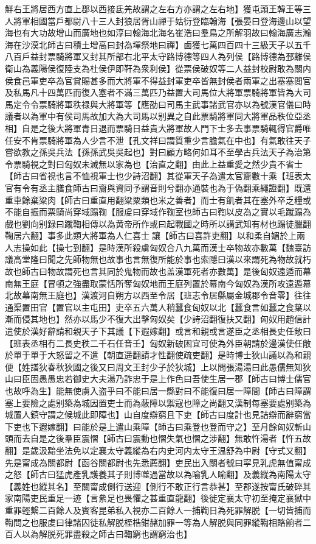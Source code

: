鮮右王將居西方直上郡以西接氐羌故謂之左右方亦謂之左右地】獲屯頭王韓王等三人將軍相國當戶都尉八十三人封狼居胥山禪于姑衍登臨翰海【張晏曰登海邊山以望海也有大功故增山而廣地也如淳曰翰海北海名崔浩曰羣鳥之所解羽故曰翰海廣志瀚海在沙漠北師古曰積土增高曰封為墠祭地曰禪】鹵獲七萬四百四十三級天子以五千八百戶益封票騎將軍又封其所部右北平太守路博德等四人為列侯【路博德為邳離侯衛山為義陽侯復陸支為杜侯伊即靬為衆利侯】從票侯破奴等二人益封校尉敢為關内侯食邑軍吏卒為官賞賜甚多而大將軍不得益封軍吏卒皆無封侯者兩軍之出塞塞閲官及私馬凡十四萬匹而復入塞者不滿三萬匹乃益置大司馬位大將軍票騎將軍皆為大司馬定令令票騎將軍秩禄與大將軍等【應劭曰司馬主武事諸武官亦以為號漢官儀曰時議者以為軍中有侯司馬故加大為大司馬以别異之自此票騎將軍同大將軍品秩位亞丞相】自是之後大將軍青日退而票騎日益貴大將軍故人門下士多去事票騎輒得官爵唯任安不肯票騎將軍為人少言不泄【孔文祥曰謂質重少言膽氣在中也】有氣敢往天子嘗欲教之孫吳兵法【孫孫武吳吳起也】對曰顧方略何如耳不至學古兵法天子為治第令票騎視之對曰匈奴未滅無以家為也【治直之翻】由此上益重愛之然少貴不省士【師古曰省視也言不恤視軍士也少詩沼翻】其從軍天子為遣太官齎數十乘【班表太官有令有丞主膳食師古曰齎與資同予謂音則兮翻亦通裝也為于偽翻乘繩證翻】既還重車餘棄粱肉【師古曰重直用翻粱粟類也米之善者】而士有飢者其在塞外卒乏糧或不能自振而票騎尚穿域蹋鞠【服䖍曰穿域作鞠室也師古曰鞫以皮為之實以毛蹴蹋為戲也劉向别録曰蹴鞫相傳以為黄帝所作或曰起戰國之時所以講武知有材也蹋徒臘翻鞠居六翻】事多此類大將軍為人仁喜士讓【師古曰喜許吏翻】以和柔自媚於上兩人志操如此【操七到翻】是時漢所殺虜匈奴合八九萬而漢士卒物故亦數萬【魏臺訪議高堂隆曰聞之先師物無也故事也言無復所能於事也索隱曰漢以來謂死為物故就朽故也師古曰物故謂死也言其同於鬼物而故也盖漢軍死者亦數萬】是後匈奴遠遁而幕南無王庭【冒頓之強盡取蒙恬所奪匈奴地而王庭列置於幕南今匈奴為漢所攻遠遁幕北故幕南無王庭也】漢渡河自朔方以西至令居【班志令居縣屬金城郡令音零】往往通渠置田官【置官以主屯田】吏卒五六萬人稍蠶食匈奴以北【蠶食言如蠶之食葉以漸而侵其地也】然亦以馬少不復大出擊匈奴矣【少詩沼翻復扶又翻】匈奴用趙信計遣使於漢好辭請和親天子下其議【下遐嫁翻】或言和親或言遂臣之丞相長史任敞曰【班表丞相冇二長史秩二千石任音壬】匈奴新破困宜可使為外臣朝請於邊漢使任敞於單于單于大怒留之不遣【朝直遥翻請才性翻使疏吏翻】是時博士狄山議以為和親便【姓譜狄春秋狄國之後又曰周文王封少子於狄城】上以問張湯湯曰此愚儒無知狄山曰臣固愚愚忠若御史大夫湯乃詐忠于是上作色曰吾使生居一郡【師古曰博士儒官也故呼為生】能無使虜入盗乎曰不能曰居一縣對曰不能復曰居一障間【師古曰障謂塞上要險之處别築為城因置吏士而為蔽障以禦寇也障之尚翻又漢制每塞要處别築為城置人鎮守謂之候城此即障也】山自度辯窮且下吏【師古曰度計也見詰辯而辭窮當下吏也下遐嫁翻】曰能於是上遣山乘障【師古曰乘登也登而守之】至月餘匈奴斬山頭而去自是之後羣臣震慴【師古曰震動也慴失氣也慴之涉翻】無敢忤湯者【忤五故翻】是歲汲黯坐法免以定襄太守義縱為右内史河内太守王温舒為中尉【守式又翻】先是甯成為關都尉【函谷關都尉也先悉薦翻】吏民出入關者號曰寜見乳虎無值甯成之怒【師古曰猛虎產乳護養其子則博噬過當故以為喻乳人喻翻】及義縱為南陽太守【義姓也縱其名】至關甯成側行送迎【側行不敢正行言恭甚】至郡遂按甯氏破碎其家南陽吏民重足一迹【言絫足也畏懼之甚重直龍翻】後徙定襄太守初至掩定襄獄中重罪輕繫二百餘人及賓客昆弟私入視亦二百餘人一捕鞫日為死罪解脱【一切皆捕而鞫問之也服䖍曰律諸囚徒私解脱桎梏鉗赭加罪一等為人解脱與同罪縱鞫相賂餉者二百人以為解脱死罪盡殺之師古曰鞫窮也謂窮治也】
